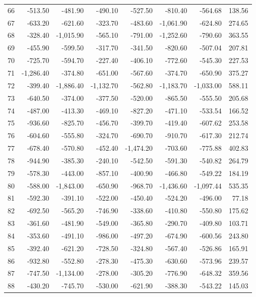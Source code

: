 \begin{longtable}{rrrrrrrr}
66 & -513.50 & -481.90 & -490.10 & -527.50 & -810.40 & -564.68 & 138.56  \\
67 & -633.20 & -621.60 & -323.70 & -483.60 & -1,061.90 & -624.80 & 274.65  \\
68 & -328.40 & -1,015.90 & -565.10 & -791.00 & -1,252.60 & -790.60 & 363.55  \\
69 & -455.90 & -599.50 & -317.70 & -341.50 & -820.60 & -507.04 & 207.81  \\
70 & -725.70 & -594.70 & -227.40 & -406.10 & -772.60 & -545.30 & 227.53  \\
71 & -1,286.40 & -374.80 & -651.00 & -567.60 & -374.70 & -650.90 & 375.27  \\
72 & -399.40 & -1,886.40 & -1,132.70 & -562.80 & -1,183.70 & -1,033.00 & 588.11  \\
73 & -640.50 & -374.00 & -377.50 & -520.00 & -865.50 & -555.50 & 205.68  \\
74 & -487.00 & -413.30 & -469.10 & -827.20 & -471.10 & -533.54 & 166.52  \\
75 & -936.60 & -825.70 & -456.70 & -399.70 & -419.40 & -607.62 & 253.58  \\
76 & -604.60 & -555.80 & -324.70 & -690.70 & -910.70 & -617.30 & 212.74  \\
77 & -678.40 & -570.80 & -452.40 & -1,474.20 & -703.60 & -775.88 & 402.83  \\
78 & -944.90 & -385.30 & -240.10 & -542.50 & -591.30 & -540.82 & 264.79  \\
79 & -578.30 & -443.00 & -857.10 & -400.90 & -466.80 & -549.22 & 184.19  \\
80 & -588.00 & -1,843.00 & -650.90 & -968.70 & -1,436.60 & -1,097.44 & 535.35  \\
81 & -592.30 & -391.10 & -522.00 & -450.40 & -524.20 & -496.00 & 77.18  \\
82 & -692.50 & -565.20 & -746.90 & -338.60 & -410.80 & -550.80 & 175.62  \\
83 & -361.60 & -481.90 & -549.00 & -365.80 & -290.70 & -409.80 & 103.71  \\
84 & -353.60 & -491.10 & -986.00 & -497.20 & -674.90 & -600.56 & 243.80  \\
85 & -392.40 & -621.20 & -728.50 & -324.80 & -567.40 & -526.86 & 165.91  \\
86 & -932.80 & -552.80 & -278.30 & -475.30 & -630.60 & -573.96 & 239.57  \\
87 & -747.50 & -1,134.00 & -278.00 & -305.20 & -776.90 & -648.32 & 359.56  \\
88 & -430.20 & -745.70 & -530.00 & -621.90 & -388.30 & -543.22 & 145.03  \\

\end{longtable}
